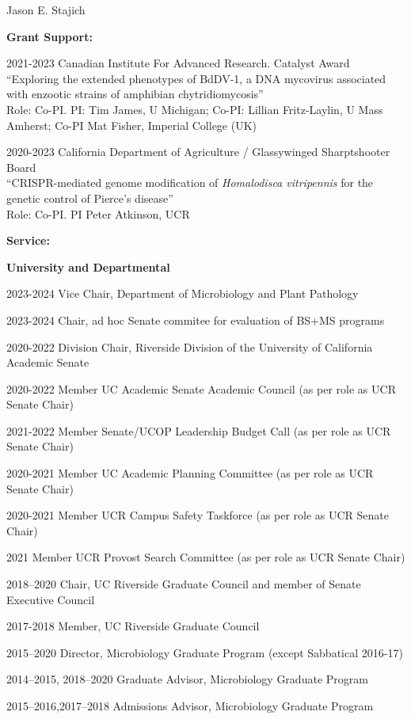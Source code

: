 \documentclass[10pt]{article}
\begin{document}
\begin{cv}{\centerline{Jason E. Stajich}}
\begin{cvlistcompact}{\bf Grant Support:}
\item [2021-2023] Canadian Institute For Advanced Research. Catalyst Award \\
  ``Exploring the extended phenotypes of BdDV-1, a DNA mycovirus associated with enzootic strains of amphibian chytridiomycosis'' \\
Role: Co-PI. PI: Tim James, U Michigan; Co-PI: Lillian Fritz-Laylin, U Mass Amherst; Co-PI Mat Fisher, Imperial College (UK)

\item [2020-2023] California Department of Agriculture / Glassywinged Sharptshooter Board  \\
``CRISPR-mediated genome modification of \textit{Homalodisca vitripennis} for the genetic control of Pierce's disease'' \\
Role: Co-PI. PI Peter Atkinson, UCR

\end{cvlistcompact}

\setlength{\cvlabelwidth}{18mm}

\begin{cvlistcompact}{\bf Service:}
\item[{\bf University and Departmental}]
\item [2023-2024] Vice Chair, Department of Microbiology and Plant Pathology
\item [2023-2024]  Chair, ad hoc Senate commitee for evaluation of BS+MS programs
\item [2020-2022] Division Chair, Riverside Division of the University of California Academic Senate
\item [2020-2022] Member UC Academic Senate Academic Council (as per role as UCR Senate Chair)
\item [2021-2022] Member Senate/UCOP Leadership Budget Call (as per role as UCR Senate Chair)
\item [2020-2021] Member UC Academic Planning Committee (as per role as UCR Senate Chair)
\item [2020-2021] Member UCR Campus Safety Taskforce (as per role as UCR Senate Chair)
\item [2021] Member UCR Provost Search Committee (as per role as UCR Senate Chair)
\item [2018--2020] Chair, UC Riverside Graduate Council and member of Senate Executive Council
\item [2017-2018] Member, UC Riverside Graduate Council
\item [2015--2020] Director, Microbiology Graduate Program (except Sabbatical 2016-17)
\item [2014--2015, 2018--2020] Graduate Advisor, Microbiology Graduate Program
\item [2015--2016,2017--2018] Admissions Advisor, Microbiology Graduate Program
\\


\end{cvlistcompact}
\end{cv}
\end{document}
